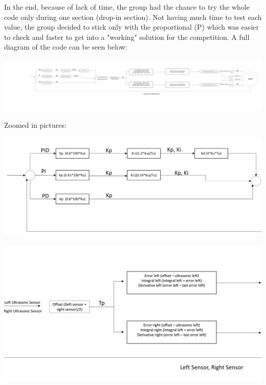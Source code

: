 \documentclass[hidelinks,a4paper,11pt]{article}
\begin{document}
\begin{mdframed}
In the end, because of lack of time, the group had the chance to try the whole code only during one section (drop-in section). Not having much time to test each value, the group decided to stick only with the proportional (P) which was easier to check and faster to get into a "working" solution for the competition. A full diagram of the code can be seen below:
		\begin{center}
			\includegraphics[width=\textwidth]{NDA.png}
		\end{center}
		\begin{huge}
			\begin{center}
				Zoomed in pictures:
			\end{center}
		\end{huge}
		\begin{center}
			\includegraphics[width=\textwidth]{NDA1.png}
		\end{center}
		\begin{center}
			\includegraphics[width=\textwidth]{NDA2.png}
		\end{center}
		\begin{center}

\end{center}
\end{mdframed}
\end{document}
